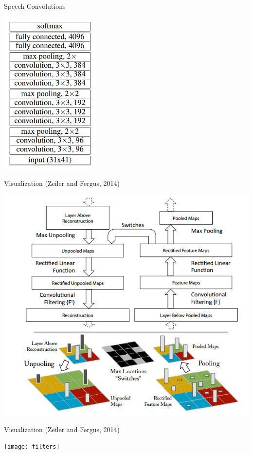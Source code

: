 \documentclass{beamer}
\begin{document}
\begin{frame}{Speech Convolutions}
  \begin{center}
    \includegraphics[width=5cm]{speechconv}
  \end{center}
  
\end{frame}

\begin{frame}{Visualization (Zeiler and Fergus, 2014)}
  \begin{center}
    \includegraphics[height=\textheight]{zf}
  \end{center}
\end{frame}

\begin{frame}{Visualization (Zeiler and Fergus, 2014)}
  \begin{center}
    \texttt{[image: filters]}
  \end{center}
  
\end{frame}
\end{document}
